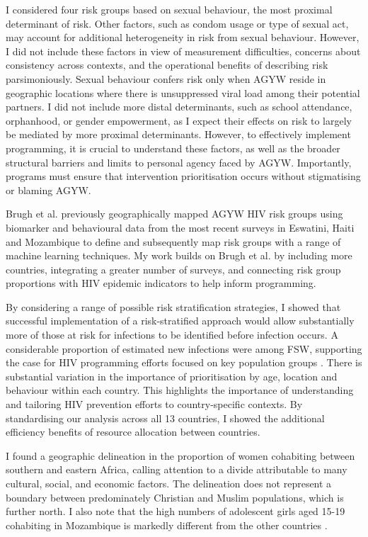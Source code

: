 \documentclass[a4paper, nobind]{templates/ociamthesis}
\begin{document}
I considered four risk groups based on sexual behaviour, the most proximal determinant of risk.
Other factors, such as condom usage or type of sexual act, may account for additional heterogeneity in risk from sexual behaviour.
However, I did not include these factors in view of measurement difficulties, concerns about consistency across contexts, and the operational benefits of describing risk parsimoniously.
Sexual behaviour confers risk only when AGYW reside in geographic locations where there is unsuppressed viral load among their potential partners.
I did not include more distal determinants, such as school attendance, orphanhood, or gender empowerment, as I expect their effects on risk to largely be mediated by more proximal determinants.
However, to effectively implement programming, it is crucial to understand these factors, as well as the broader structural barriers and limits to personal agency faced by AGYW.
Importantly, programs must ensure that intervention prioritisation occurs without stigmatising or blaming AGYW.

Brugh et al. \autocite{brugh2021characterizing} previously geographically mapped AGYW HIV risk groups using biomarker and behavioural data from the most recent surveys in Eswatini, Haiti and Mozambique to define and subsequently map risk groups with a range of machine learning techniques.
My work builds on Brugh et al. \autocite{brugh2021characterizing} by including more countries, integrating a greater number of surveys, and connecting risk group proportions with HIV epidemic indicators to help inform programming.

By considering a range of possible risk stratification strategies, I showed that successful implementation of a risk-stratified approach would allow substantially more of those at risk for infections to be identified before infection occurs.
A considerable proportion of estimated new infections were among FSW, supporting the case for HIV programming efforts focused on key population groups \autocite{baral2012burden}.
There is substantial variation in the importance of prioritisation by age, location and behaviour within each country.
This highlights the importance of understanding and tailoring HIV prevention efforts to country-specific contexts.
By standardising our analysis across all 13 countries, I showed the additional efficiency benefits of resource allocation between countries.

I found a geographic delineation in the proportion of women cohabiting between southern and eastern Africa, calling attention to a divide attributable to many cultural, social, and economic factors.
The delineation does not represent a boundary between predominately Christian and Muslim populations, which is further north.
I also note that the high numbers of adolescent girls aged 15-19 cohabiting in Mozambique is markedly different from the other countries \autocite{unicef}.
\end{document}
